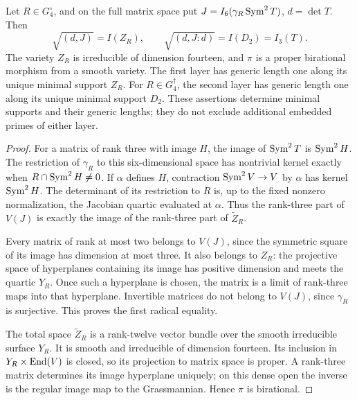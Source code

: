 \begin{theorem}
\label{thm:global-minimal-supports}
Let \(R\in G_4^\circ\), and on the full matrix space put
\(J=I_6(\gamma_R\operatorname{Sym}^2T)\), \(d=\det T\).  Then
\[
 \sqrt{(d,J)}=I(Z_R),
 \qquad
 \sqrt{(d,J:d)}=I(D_2)=I_3(T).
\]
The variety \(Z_R\) is irreducible of dimension fourteen, and
\(\pi\) is a proper birational morphism from a smooth variety.
The first layer has generic length one along its unique minimal
support \(Z_R\).  For \(R\in G_4^\dagger\), the second layer has
generic length one along its unique minimal support \(D_2\).
These assertions determine minimal supports and their generic lengths;
they do not exclude additional embedded primes of either layer.
\end{theorem}
\begin{proof}
For a matrix of rank three with image \(H\), the image of
\(\operatorname{Sym}^2T\) is \(\operatorname{Sym}^2H\).  The restriction of \(\gamma_R\)
to this six-dimensional space has nontrivial kernel exactly when
\(R\cap\operatorname{Sym}^2H\ne0\).  If \(\alpha\) defines \(H\), contraction
\(\operatorname{Sym}^2V\to V\) by \(\alpha\) has kernel \(\operatorname{Sym}^2H\).
The determinant of its restriction to \(R\) is, up to the fixed
nonzero normalization, the Jacobian quartic evaluated at \(\alpha\).
Thus the rank-three part of \(V(J)\) is exactly the image of the
rank-three part of \(\widetilde Z_R\).

Every matrix of rank at most two belongs to \(V(J)\), since the
symmetric square of its image has dimension at most three.  It also
belongs to \(Z_R\): the projective space of hyperplanes containing
its image has positive dimension and meets the quartic \(Y_R\).
Once such a hyperplane is chosen, the matrix is a limit of rank-three
maps into that hyperplane.  Invertible matrices do not belong to
\(V(J)\), since \(\gamma_R\) is surjective.  This proves the first
radical equality.

The total space \(\widetilde Z_R\) is a rank-twelve vector bundle
over the smooth irreducible surface \(Y_R\).  It is smooth and
irreducible of dimension fourteen.  Its inclusion in
\(Y_R\times\operatorname{End}(V)\) is closed, so its projection to matrix space
is proper.  A rank-three matrix determines its image hyperplane
uniquely; on this dense open the inverse is the regular image map to
the Grassmannian.  Hence \(\pi\) is birational.


\end{proof}
